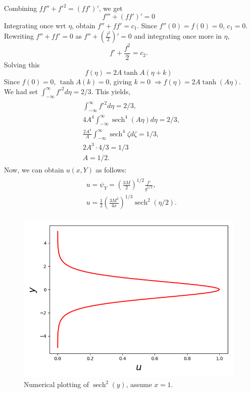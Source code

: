 \documentclass{article}
\DeclareMathOperator{\sech}{sech}
\begin{document}
Combining $ff'' + f'^{2} = (ff')'$, we get\
\begin{equation}
 f''' + (ff')' = 0
\end{equation}
Integrating once wrt $\eta$, obtain $f'' + ff' = c_{1}$. Since $f''(0) = f(0) = 0$, $\boxed{c_{1} = 0}$. Rewriting $f'' + ff' = 0$ as $f'' + \left(\frac{f^{2}}{2}\right)' = 0$ and integrating once more in $\eta$, 
\begin{equation}
 f'+ \frac{f^{2}}{2} = c_{2}.
\end{equation}
Solving this
\begin{equation}
 f(\eta) = 2A \tanh{A(\eta + k)}
\end{equation}
Since $f(0) = 0$, $\tanh{A(k)} = 0$, giving $\boxed{k = 0}$ $\Rightarrow \boxed{f(\eta) = 2A \tanh{(A\eta)}}  $.\\
%
We had set $\int_{-\infty}^{\infty} f'^{2}d\eta = 2/3$. This yields,
\begin{align}
 \begin{split}
  & \int_{-\infty}^{\infty} f'^{2}d\eta = 2/3, \\
  & 4 A^{4} \int_{-\infty}^{\infty} \sech^{4}{(A\eta)}d\eta = 2/3,\\
  &\frac{2A^{4}}{A}\int_{-\infty}^{\infty} \sech^{4}{\zeta} d\zeta = 1/3,\\
  & 2 A^{3} \cdot 4/3 = 1/3\\
  & \boxed{A = 1/2}.
 \end{split}
\end{align}
%
Now, we can obtain $u(x, Y)$ as follows:
\begin{align}
 \begin{split}
  & u = \psi_{Y} =  \left(\frac{3M}{2}\right)^{1/2} \frac{f'}{g^{1/2}}, \\
  & \boxed{u =\frac{1}{2}\left(\frac{3M^{2}}{4x}\right)^{1/3}\sech^{2}{(\eta/2)} }.
 \end{split}
\end{align}
\begin{figure}[H]
    \centering
    \includegraphics[scale = 0.8]{Figs/laminar_jet_profile.png}
    \caption{Numerical plotting of $\sech^{2}(y)$, assume $x = 1$.}
    \label{fig:laminar_jet}
\end{figure}
\end{document}
